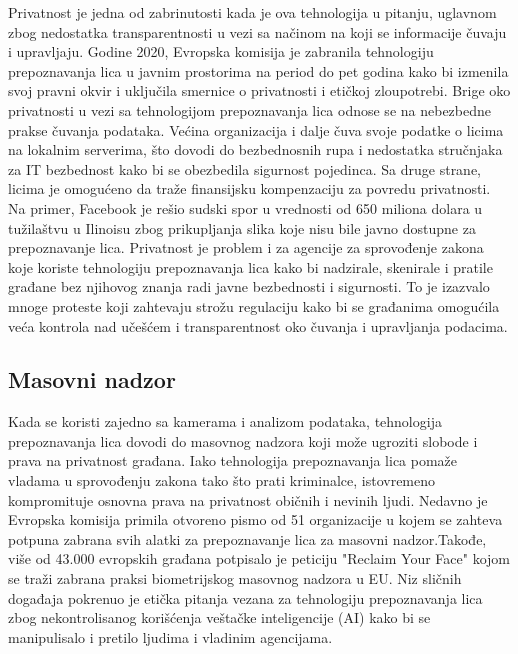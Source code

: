 \documentclass{article}
\begin{document}
Privatnost je jedna od zabrinutosti kada je ova tehnologija u pitanju, uglavnom zbog nedostatka transparentnosti u vezi sa načinom na koji se informacije čuvaju i upravljaju. 
\newline
\newline
Godine 2020, Evropska komisija je zabranila tehnologiju prepoznavanja lica u javnim prostorima na period do pet godina kako bi izmenila svoj pravni okvir i uključila smernice o privatnosti i etičkoj zloupotrebi.
\newline
\newline
Brige oko privatnosti u vezi sa tehnologijom prepoznavanja lica odnose se na nebezbedne prakse čuvanja podataka. Većina organizacija i dalje čuva svoje podatke o licima na lokalnim serverima, što dovodi do bezbednosnih rupa i nedostatka stručnjaka za IT bezbednost kako bi se obezbedila sigurnost pojedinca.
\newline
\newline
Sa druge strane, licima je omogućeno da traže finansijsku kompenzaciju za povredu privatnosti. Na primer, Facebook je rešio sudski spor u vrednosti od 650 miliona dolara u tužilaštvu u Ilinoisu zbog prikupljanja slika koje nisu bile javno dostupne za prepoznavanje lica.
\newline
\newline
Privatnost je problem i za agencije za sprovođenje zakona koje koriste tehnologiju prepoznavanja lica kako bi nadzirale, skenirale i pratile građane bez njihovog znanja radi javne bezbednosti i sigurnosti. To je izazvalo mnoge proteste koji zahtevaju strožu regulaciju kako bi se građanima omogućila veća kontrola nad učešćem i transparentnost oko čuvanja i upravljanja podacima.


\subsection{Masovni nadzor}

Kada se koristi zajedno sa kamerama i analizom podataka, tehnologija prepoznavanja lica dovodi do masovnog nadzora koji može ugroziti slobode i prava na privatnost građana. Iako tehnologija prepoznavanja lica pomaže vladama u sprovođenju zakona tako što prati kriminalce, istovremeno kompromituje osnovna prava na privatnost običnih i nevinih ljudi.
\newline
\newline
Nedavno je Evropska komisija primila otvoreno pismo od 51 organizacije u kojem se zahteva potpuna zabrana svih alatki za prepoznavanje lica za masovni nadzor.Takođe, više od 43.000 evropskih građana potpisalo je peticiju "Reclaim Your Face" kojom se traži zabrana praksi biometrijskog masovnog nadzora u EU.
\newline
\newline
Niz sličnih događaja pokrenuo je etička pitanja vezana za tehnologiju prepoznavanja lica zbog nekontrolisanog korišćenja veštačke inteligencije (AI) kako bi se manipulisalo i pretilo ljudima i vladinim agencijama.
\end{document}
